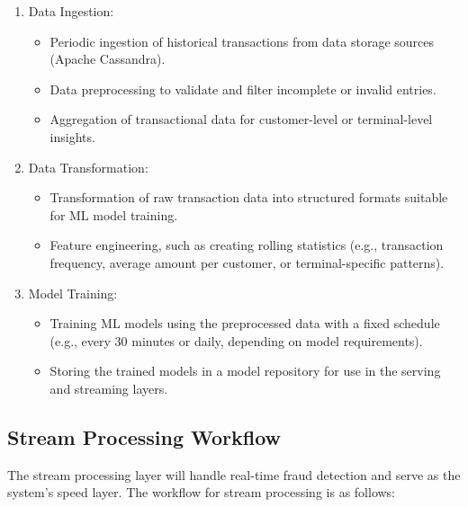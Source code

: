 \documentclass[12pt,a4paper, hidelinks]{article}
\begin{document}
\begin{enumerate}
    \item Data Ingestion:
        \begin{itemize}
            \item Periodic ingestion of historical transactions from data storage sources (Apache Cassandra).
            \item Data preprocessing to validate and filter incomplete or invalid entries.
            \item Aggregation of transactional data for customer-level or terminal-level insights.
        \end{itemize}
    \item Data Transformation:
        \begin{itemize}
            \item Transformation of raw transaction data into structured formats suitable for ML model training.
            \item Feature engineering, such as creating rolling statistics (e.g., transaction frequency, average amount per customer, or terminal-specific patterns).
        \end{itemize}
    \item Model Training:
        \begin{itemize}
            \item Training ML models using the preprocessed data with a fixed schedule (e.g., every 30 minutes or daily, depending on model requirements).
            \item Storing the trained models in a model repository for use in the serving and streaming layers.
        \end{itemize}
\end{enumerate}

\subsection{Stream Processing Workflow}
The stream processing layer will handle real-time fraud detection and serve as the system's speed layer. The workflow for stream processing is as follows:
\end{document}
